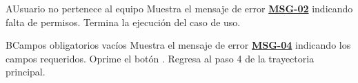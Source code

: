 \begin{UCtrayectoriaA}{A}{Usuario no pertenece al equipo}
	\UCpaso Muestra el mensaje de error \hyperlink{mMSG02}{\bf MSG-02} indicando falta de permisos.
	\UCpaso Termina la ejecución del caso de uso.
\end{UCtrayectoriaA}

\begin{UCtrayectoriaA}{B}{Campos obligatorios vacíos}
	\UCpaso Muestra el mensaje de error \hyperlink{mMSG04}{\bf MSG-04} indicando los campos requeridos.
	\UCpaso[\UCactor] Oprime el botón .
	\UCpaso Regresa al paso 4 de la trayectoria principal.
\end{UCtrayectoriaA}

